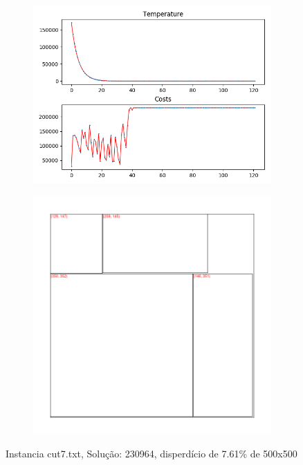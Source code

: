 \begin{figure}
\centering
\begin{subfigure}{.5\textwidth}
  \centering
  \includegraphics[width=1\linewidth]{results/cut7/1/plot}
  \label{fig:sub1}
\end{subfigure}%
\begin{subfigure}{.5\textwidth}
  \centering
  \includegraphics[width=1\linewidth]{results/cut7/1/cut}
  \label{fig:sub2}
\end{subfigure}
\caption{Instancia cut7.txt, Solução: 230964, disperdício de 7.61\% de 500x500}
\label{fig:test}
\end{figure}


